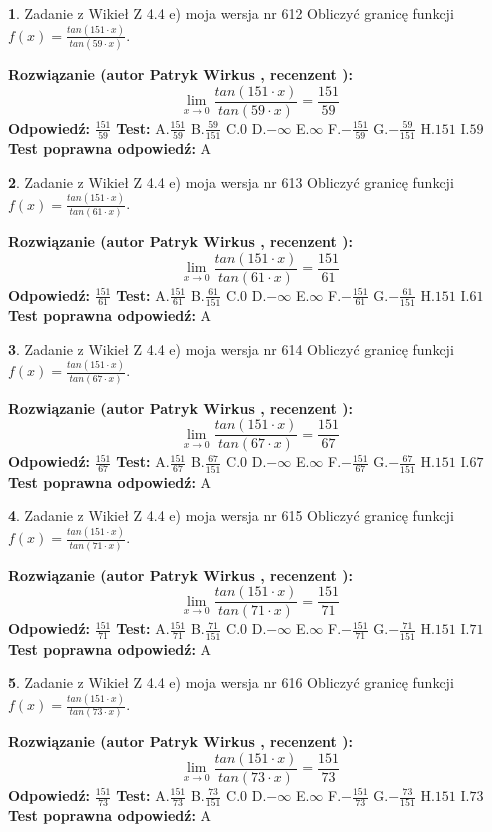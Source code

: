 \documentclass[12pt, a4paper]{article}
\theoremstyle{definition} %
\newtheorem{zad}{}
\newcommand{\zadStart}[1]{\begin{zad}#1\newline}
\newcommand{\zadStop}{\end{zad}}
\newcommand{\rozwStart}[2]{\noindent \textbf{Rozwiązanie (autor #1 , recenzent #2): }\newline}
\newcommand{\rozwStop}{\newline}
\newcommand{\odpStart}{\noindent \textbf{Odpowiedź:}\newline}
\newcommand{\odpStop}{\newline}
\newcommand{\testStart}{\noindent \textbf{Test:}\newline}
\newcommand{\testStop}{\newline}
\newcommand{\kluczStart}{\noindent \textbf{Test poprawna odpowiedź:}\newline}
\newcommand{\kluczStop}{\newline}
\begin{document}
\zadStart{Zadanie z Wikieł Z 4.4 e) moja wersja nr 612}
Obliczyć granicę funkcji $f(x)=\frac{tan(151\cdot x)}{tan(59\cdot x)}$.
\zadStop
\rozwStart{Patryk Wirkus}{}
$$\lim\limits_{x\to 0}\frac{tan(151\cdot x)}{tan(59\cdot x)}=
\frac{151}{59}$$
\rozwStop
\odpStart
$\frac{151}{59}$
\odpStop
\testStart
A.$\frac{151}{59}$
B.$\frac{59}{151}$
C.$0$
D.$-\infty$
E.$\infty$
F.$-\frac{151}{59}$
G.$-\frac{59}{151}$
H.$151$
I.$59$
\testStop
\kluczStart
A
\kluczStop



\zadStart{Zadanie z Wikieł Z 4.4 e) moja wersja nr 613}
Obliczyć granicę funkcji $f(x)=\frac{tan(151\cdot x)}{tan(61\cdot x)}$.
\zadStop
\rozwStart{Patryk Wirkus}{}
$$\lim\limits_{x\to 0}\frac{tan(151\cdot x)}{tan(61\cdot x)}=
\frac{151}{61}$$
\rozwStop
\odpStart
$\frac{151}{61}$
\odpStop
\testStart
A.$\frac{151}{61}$
B.$\frac{61}{151}$
C.$0$
D.$-\infty$
E.$\infty$
F.$-\frac{151}{61}$
G.$-\frac{61}{151}$
H.$151$
I.$61$
\testStop
\kluczStart
A
\kluczStop



\zadStart{Zadanie z Wikieł Z 4.4 e) moja wersja nr 614}
Obliczyć granicę funkcji $f(x)=\frac{tan(151\cdot x)}{tan(67\cdot x)}$.
\zadStop
\rozwStart{Patryk Wirkus}{}
$$\lim\limits_{x\to 0}\frac{tan(151\cdot x)}{tan(67\cdot x)}=
\frac{151}{67}$$
\rozwStop
\odpStart
$\frac{151}{67}$
\odpStop
\testStart
A.$\frac{151}{67}$
B.$\frac{67}{151}$
C.$0$
D.$-\infty$
E.$\infty$
F.$-\frac{151}{67}$
G.$-\frac{67}{151}$
H.$151$
I.$67$
\testStop
\kluczStart
A
\kluczStop



\zadStart{Zadanie z Wikieł Z 4.4 e) moja wersja nr 615}
Obliczyć granicę funkcji $f(x)=\frac{tan(151\cdot x)}{tan(71\cdot x)}$.
\zadStop
\rozwStart{Patryk Wirkus}{}
$$\lim\limits_{x\to 0}\frac{tan(151\cdot x)}{tan(71\cdot x)}=
\frac{151}{71}$$
\rozwStop
\odpStart
$\frac{151}{71}$
\odpStop
\testStart
A.$\frac{151}{71}$
B.$\frac{71}{151}$
C.$0$
D.$-\infty$
E.$\infty$
F.$-\frac{151}{71}$
G.$-\frac{71}{151}$
H.$151$
I.$71$
\testStop
\kluczStart
A
\kluczStop



\zadStart{Zadanie z Wikieł Z 4.4 e) moja wersja nr 616}
Obliczyć granicę funkcji $f(x)=\frac{tan(151\cdot x)}{tan(73\cdot x)}$.
\zadStop
\rozwStart{Patryk Wirkus}{}
$$\lim\limits_{x\to 0}\frac{tan(151\cdot x)}{tan(73\cdot x)}=
\frac{151}{73}$$
\rozwStop
\odpStart
$\frac{151}{73}$
\odpStop
\testStart
A.$\frac{151}{73}$
B.$\frac{73}{151}$
C.$0$
D.$-\infty$
E.$\infty$
F.$-\frac{151}{73}$
G.$-\frac{73}{151}$
H.$151$
I.$73$
\testStop
\kluczStart
A
\kluczStop
\end{document}
